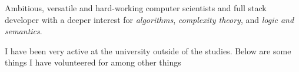 





\begin{fullwidth}
  Ambitious, versatile and hard-working computer scientists and full stack
  developer with a deeper interest for \emph{algorithms}, \emph{complexity
    theory}, and \emph{logic and semantics}.
\end{fullwidth}





\divider



\divider



I have been very active at the university outside of the studies. Below are some
things I have volunteered for among other things

\medskip



\divider \newpage



\divider




